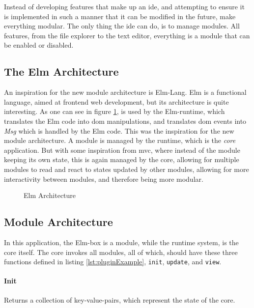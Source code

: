 Instead of developing features that make up an \gls{ide}, and attempting to
ensure it is implemented in such a manner that it can be modified in the future,
make everything modular. The only thing the \gls{ide} can do, is to manage
modules. All features, from the file explorer to the text editor, everything is
a module that can be enabled or disabled.

\subsection{The Elm Architecture}


An inspiration for the new module architecture is Elm-Lang. Elm is a functional
language, aimed at frontend web development, but its architecture is quite
interesting. As one can see in figure \ref{fig:elmArchitecture}, is used by the
Elm-runtime, which translates the Elm code into \gls{dom} manipulations, and
translates \gls{dom} events into \textit{Msg} which is handled by the Elm code.
This was the inspiration for the new module architecture. A module is managed by
the runtime, which is the \textit{core} application. But with some inspiration
from \gls{mvc}, where instead of the module keeping its own state, this is again
managed by the core, allowing for multiple modules to read and react to states
updated by other modules, allowing for more interactivity between modules, and
therefore being more modular.


\begin{figure}
  \centering
  
  \caption{Elm Architecture}
  \label{fig:elmArchitecture}
\end{figure}

\subsection{Module Architecture}

In this application, the Elm-box is a module, while the runtime system, is the
core itself. The core invokes all modules, all of which, should have these three
functions defined in listing \ref{lst:pluginExample}, \lstinline{init},
\lstinline{update}, and \lstinline{view}.

\paragraph{Init} Returns a collection of key-value-pairs, which represent
the state of the core.

